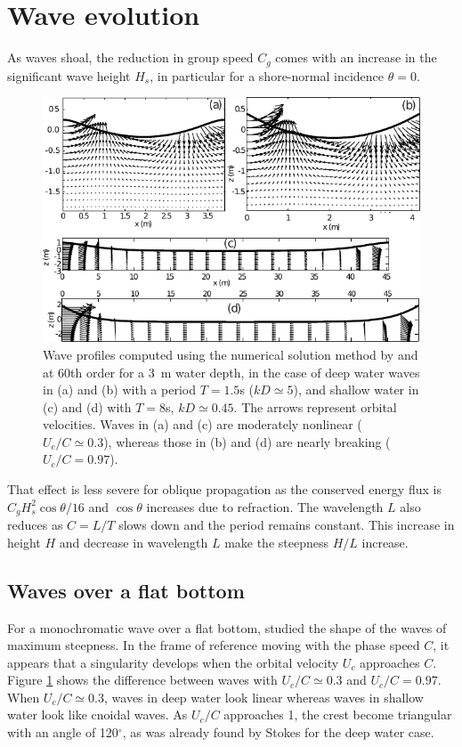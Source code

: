 \section{Wave evolution}
As waves shoal, the reduction in group speed $C_g$ comes with an increase in the significant wave height $H_s$, in particular 
for a shore-normal incidence $\theta=0$. 
\begin{figure}[htb]
 \vspace{9pt}
\centerline{\includegraphics[width=0.7\linewidth]{FIGS_CH_SURF/wave_shape_near_breaking.pdf}}
 \caption{Wave profiles computed using the numerical solution method by\cite{Dean1965} and \cite{Dalrymple1974} 
 at 60th order for a 3~m water depth, in the case of deep water waves in (a) and (b) with a period $T=1.5$s ($kD \simeq 5$), and 
 shallow water in  (c) and (d)  with $T=8$s, $kD \simeq 0.45$. The arrows represent orbital velocities. 
 Waves in (a) and (c) are moderately nonlinear ($U_c/C \simeq 0.3$), whereas those in (b) and (d) are nearly 
 breaking ($U_c/C = 0.97$). 
 }
 \label{fig:WAVES}
\end{figure}
That effect is less severe for oblique propagation as the conserved energy flux is  $C_g H_s^2 \cos \theta
/16$  and $\cos \theta$ increases due to refraction. The wavelength $L$ also reduces as $C=L/T$ slows down and the period remains constant. 
This increase in height $H$ and decrease in wavelength $L$ make the steepness $H/L$ increase. 

\subsection{Waves over a flat bottom}
For a monochromatic wave over a flat bottom, \cite{Miche1944d} studied the shape of the waves of maximum steepness. 
In the frame of reference moving with the phase speed $C$, 
it appears that a singularity develops when the orbital velocity $U_c$ approaches $C$. Figure \ref{fig:WAVES} shows 
the difference between waves with $U_c/C \simeq 0.3$ and $U_c/C = 0.97$. When $U_c/C \simeq 0.3$, waves in deep water look linear 
whereas waves in shallow water look like cnoidal waves. As $U_c/C$ approaches 1, the crest become triangular 
with an angle of 120$^\circ$, as was already found by Stokes for the deep water case.


